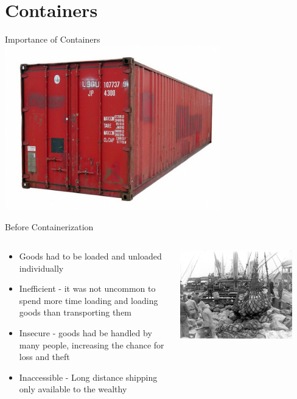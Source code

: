 \section{Containers}

\begin{frame}{Importance of Containers}
	\centering
\includegraphics[width=0.7\textwidth]{figures/shipping_container}
\end{frame}

\begin{frame}{Before Containerization}
	\begin{columns}[c]
		\begin{column}{0.5\textwidth}
			\begin{itemize}
				\item Goods had to be loaded and unloaded individually
				
				 \item Inefficient - it was not uncommon to spend more time loading and loading goods than transporting them
				 
				 \item Insecure - goods had be handled by many people, increasing the chance for loss and theft
				 
				 \item Inaccessible - Long distance shipping only available to the wealthy 
			\end{itemize}
		\end{column}
	\begin{column}{0.5\textwidth}
		\centering
	\includegraphics[width=0.85\textwidth]{figures/old_ship_unloading}
\end{column}
\end{columns}
\end{frame}

